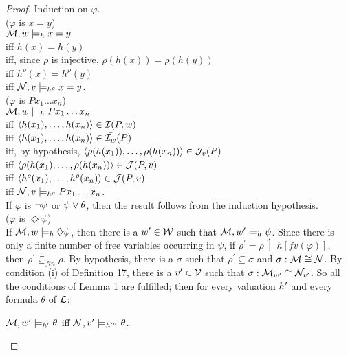 \begin{proof}
Induction on $\varphi$.\\


($\varphi$ is $x=y$)\\

$\mathcal{M},w \models_{h} x = y$ \\
iff $h(x) = h(y)$\\
iff, since $\rho$ is injective, $\rho(h(x)) = \rho(h(y))$\\
iff $h^{\rho}(x) = h^{\rho}(y)$\\
iff  $\mathcal{N},v \models_{h^{\rho}} x = y$.\\

($\varphi$ is $Px_{1}\dots x_{n}$)\\

$\mathcal{M},w \models_{h} Px_{1}\dots x_{n}$\\
iff $\langle h(x_{1}), \dots, h(x_{n})\rangle \in \mathcal{I}(P,w)$\\
iff $\langle h(x_{1}), \dots, h(x_{n}) \rangle \in \bar{\mathcal{I}_{w}}(P)$\\
iff, by hypothesis,  $\langle \rho(h(x_{1})), \dots, \rho(h(x_{n})) \rangle \in \bar{\mathcal{J}_{v}}(P)$\\
iff $\langle \rho(h(x_{1}), \dots, \rho(h(x_{n})) \rangle \in \mathcal{J}(P,v)$\\
iff $\langle h^{\rho}(x_{1}), \dots, h^{\rho}(x_{n}) \rangle \in \mathcal{J}(P,v)$\\
iff  $\mathcal{N},v \models_{h^{\rho}} Px_{1}\dots x_{n}$.\\

\qquad If $\varphi$ is $\neg \psi$ or $\psi \vee \theta$, then the result follows from the induction hypothesis.\\


($\varphi$ is $\Diamond \psi$)\\

\qquad If $\mathcal{M},w \models_{h} \Diamond \psi$, then there is a $w^{\prime} \in \mathcal{W}$ such that $\mathcal{M},w^{\prime} \models_{h} \psi$. Since there is only a finite number of free variables occurring in $\psi$, if $\rho^{\prime} = \rho\upharpoonleft$ $h[fv(\varphi)]$, then $\rho^{\prime} \subseteq_{fin} \rho$. By hypothesis, there is a $\sigma$ such that $\rho^{\prime} \subseteq \sigma$ and $\sigma: \mathcal{M} \cong \mathcal{N}$. By condition (i) of Definition 17, there is a $v^{\prime} \in \mathcal{V}$ such that $\sigma: \mathcal{M}_{w^{\prime}} \cong \mathcal{N}_{v^{\prime}}$. So all the conditions of Lemma 1 are fulfilled; then for every valuation $h^{\prime}$ and every formula $\theta$ of $\mathcal{L}$:

\begin{center}
$\mathcal{M},w^{\prime} \models_{h^{\prime}} \theta$ iff $\mathcal{N},v^{\prime} \models_{{h^{\prime}}^{\sigma}} \theta$.
\end{center}


\end{proof}
